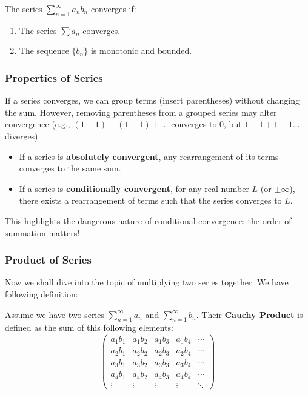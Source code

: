 \begin{theorem}
The series $\sum_{n=1}^{\infty} a_n b_n$ converges if:
\begin{enumerate}
    \item The series $\sum a_n$ converges.
    \item The sequence $\{b_n\}$ is monotonic and bounded.
\end{enumerate}
\end{theorem}

\subsubsection{Properties of Series}

\begin{theorem}[Associativity]
If a series converges, we can group terms (insert parentheses) without changing the sum. However, removing parentheses from a grouped series may alter convergence (e.g., $(1-1)+(1-1)+\dots$ converges to 0, but $1-1+1-1\dots$ diverges).
\end{theorem}

\begin{theorem}
\begin{itemize}
    \item If a series is \textbf{absolutely convergent}, any rearrangement of its terms converges to the same sum.
    \item If a series is \textbf{conditionally convergent}, for any real number $L$ (or $\pm \infty$), there exists a rearrangement of terms such that the series converges to $L$.
\end{itemize}
This highlights the dangerous nature of conditional convergence: the order of summation matters!
\end{theorem}

\subsubsection{Product of Series}
Now we shall dive into the topic of multiplying two series together. We have following definition:

\begin{definition}
    Assume we have two series $\sum_{n=1}^{\infty} a_n$ and $\sum_{n=1}^{\infty} b_n$. Their \textbf{Cauchy Product} is defined as the sum of this following elements:
    \[\begin{pmatrix}
        a_1 b_1 & a_1 b_2 & a_1 b_3 & a_1 b_4 & \cdots \\
        a_2 b_1 & a_2 b_2 & a_2 b_3 & a_2 b_4 & \cdots \\
        a_3 b_1 & a_3 b_2 & a_3 b_3 & a_3 b_4 & \cdots \\
        a_4 b_1 & a_4 b_2 & a_4 b_3 & a_4 b_4 & \cdots \\
    \vdots   & \vdots   & \vdots   & \vdots   & \ddots
    \end{pmatrix}\]
\end{definition}

